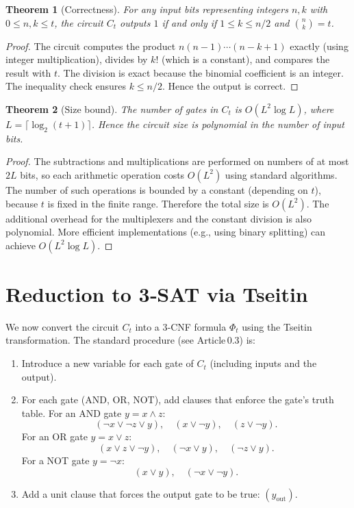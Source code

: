 \documentclass[11pt,a4paper]{article}
\newtheorem{theorem}{Theorem}[section]
\begin{document}
\begin{theorem}[Correctness]
\label{thm:correct}
For any input bits representing integers \(n,k\) with \(0\le n,k \le t\), the circuit \(C_t\) outputs \(1\) if and only if \(1\le k \le n/2\) and \(\binom{n}{k}=t\).
\end{theorem}
\begin{proof}
The circuit computes the product \(n(n-1)\cdots(n-k+1)\) exactly (using integer multiplication), divides by \(k!\) (which is a constant), and compares the result with \(t\). The division is exact because the binomial coefficient is an integer. The inequality check ensures \(k \le n/2\). Hence the output is correct.
\end{proof}

\begin{theorem}[Size bound]
\label{thm:size}
The number of gates in \(C_t\) is \(O(L^2 \log L)\), where \(L = \lceil \log_2(t+1)\rceil\). Hence the circuit size is polynomial in the number of input bits.
\end{theorem}
\begin{proof}
The subtractions and multiplications are performed on numbers of at most \(2L\) bits, so each arithmetic operation costs \(O(L^2)\) using standard algorithms. The number of such operations is bounded by a constant (depending on \(t\)), because \(t\) is fixed in the finite range. Therefore the total size is \(O(L^2)\). The additional overhead for the multiplexers and the constant division is also polynomial. More efficient implementations (e.g., using binary splitting) can achieve \(O(L^2 \log L)\).
\end{proof}

\section{Reduction to 3‑SAT via Tseitin}

We now convert the circuit \(C_t\) into a 3‑CNF formula \(\Phi_t\) using the Tseitin transformation. The standard procedure (see Article 0.3) is:

\begin{enumerate}
\item Introduce a new variable for each gate of \(C_t\) (including inputs and the output).
\item For each gate (AND, OR, NOT), add clauses that enforce the gate’s truth table. For an AND gate \(y = x \land z\):
   \[
   (\neg x \lor \neg z \lor y),\quad (x \lor \neg y),\quad (z \lor \neg y).
   \]
   For an OR gate \(y = x \lor z\):
   \[
   (x \lor z \lor \neg y),\quad (\neg x \lor y),\quad (\neg z \lor y).
   \]
   For a NOT gate \(y = \neg x\):
   \[
   (x \lor y),\quad (\neg x \lor \neg y).
   \]
\item Add a unit clause that forces the output gate to be true: \((y_{\text{out}})\).
\end{enumerate}
\end{document}
